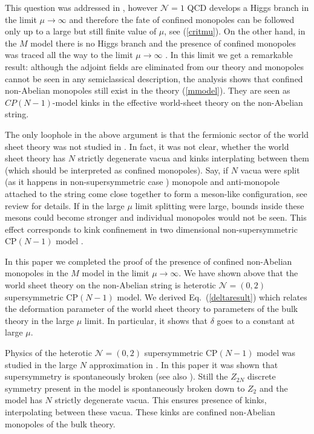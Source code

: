 \documentclass[12pt]{article}
\newcommand{\ntwoo}{${\mathcal N}= \left(0,2\right) $ }
\newcommand{\none}{${\mathcal N}=1$ }
\begin{document}
This question was addressed in \cite{SYhet}, however \none QCD  develops a Higgs branch in the 
limit $\mu\to\infty$ 
and therefore the fate of confined monopoles can be followed only up to a
large but still  finite value of $\mu$, see (\ref{critmu}). On the other hand, in the $M$ model
there is no Higgs branch and the presence of confined monopoles was traced all the way to
the limit $\mu\to\infty$ \cite{GSYmmodel}.
In this limit we get a remarkable result: although the adjoint fields 
are eliminated from our theory 
and  monopoles cannot be seen in any semiclassical description,
the  analysis shows
that confined non-Abelian monopoles still exist in the theory (\ref{mmodel}). They are seen
as $CP(N-1)$-model kinks in the effective world-sheet theory on the non-Abelian string.

The only loophole in the above argument is that the fermionic sector of the world sheet theory
was not studied in \cite{GSYmmodel}. In fact, it was not clear, whether the world sheet theory has
$N$ strictly degenerate  vacua and kinks interplating between them (which should be interpreted as
confined  monopoles). Say, if $N$ vacua were split (as it happens in non-supersymmetric case
\cite{GSY05}) monopole and anti-monopole attached to the string come close together to form a 
meson-like configuration, see review \cite{SYrev} for details. If in the large $\mu$ limit splitting
were large, bounds inside these mesons could become stronger and individual monopoles would not
be seen. This effect corresponds to kink confinement in two dimensional 
non-supersymmetric CP$(N-1)$ model \cite{W79}.


In this paper we completed the proof of the presence of confined  non-Abelian monopoles
in the $M$ model in the limit $\mu\to\infty$. We have shown above that the world sheet
theory on the non-Abelian string is heterotic \ntwoo supersymmetric CP$(N-1)$ model.
We derived Eq.~(\ref{deltaresult}) which relates the deformation parameter of the world sheet theory
to parameters of the bulk theory in the large $\mu$ limit. In particular, it shows that $\delta$
goes to a constant  at large $\mu$.

Physics of the heterotic \ntwoo supersymmetric CP$(N-1)$ model was studied in the large $N$ approximation in \cite{SYhet2}. In this paper it was shown that supersymmetry is spontaneously broken (see also \cite{Thetdyn}). Still the $Z_{2N}$ discrete symmetry present in the model is
spontaneously broken down to $Z_2$ and the model has $N$ strictly degenerate vacua.
This ensures presence of kinks, interpolating between these vacua. These kinks are
confined non-Abelian monopoles of the bulk theory.
\end{document}

